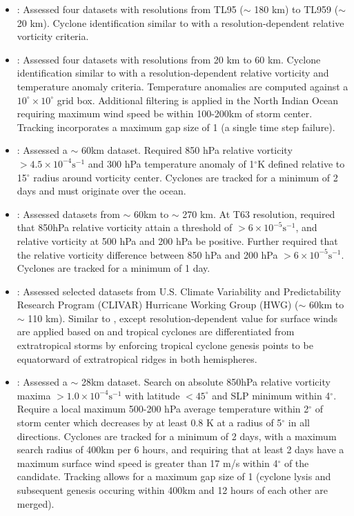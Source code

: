 \documentclass[gmdd, hvmath, online]{copernicus_discussions}
\begin{document}
\begin{itemize}
\item \cite{murakami2010effect}:  Assessed four datasets with resolutions from TL95 ($\sim$ 180 km) to TL959 ($\sim$ 20 km).  Cyclone identification similar to \cite{oouchi2006tropical} with a resolution-dependent relative vorticity criteria.

\item \cite{murakami2012future}:  Assessed four datasets with resolutions from 20 km to 60 km.  Cyclone identification similar to \cite{oouchi2006tropical} with a resolution-dependent relative vorticity and temperature anomaly criteria.  Temperature anomalies are computed against a $10^\circ \times 10^\circ$ grid box.  Additional filtering is applied in the North Indian Ocean requiring maximum wind speed be within 100-200km of storm center.  Tracking incorporates a maximum gap size of 1 (a single time step failure).

\item \cite{auyeung2012regcm, huang2014wpac}: Assessed a $\sim$ 60km dataset. Required 850 hPa relative vorticity $> 4.5 \times 10^{-4} \mbox{s}^{-1}$ and 300 hPa temperature anomaly of 1$^\circ$K defined relative to 15$^\circ$ radius around vorticity center. Cyclones are tracked for a minimum of 2 days and must originate over the ocean.

\item \cite{strachan2013investigating}:  Assessed datasets from $\sim$ 60km to $\sim$ 270 km.  At T63 resolution, required that 850hPa relative vorticity attain a threshold of $> 6 \times 10^{-5} \mbox{s}^{-1}$, and relative vorticity at 500 hPa and 200 hPa be positive.  Further required that the relative vorticity difference between 850 hPa and 200 hPa $> 6 \times 10^{-5} \mbox{s}^{-1}$.  Cyclones are tracked for a minimum of 1 day.

\item \cite{horn2014tracking}:  Assessed selected datasets from U.S. Climate Variability and Predictability Research Program (CLIVAR) Hurricane Working Group (HWG) \citep{Walsh2015CLIVAR} ($\sim$ 60km to $\sim$ 110 km). Similar to \citet{walsh2004fine}, except resolution-dependent value for surface winds are applied based on \citet{walsh2007objectively} and tropical cyclones are differentiated from extratropical storms by enforcing tropical cyclone genesis points to be equatorward of extratropical ridges in both hemispheres.

\item \cite{zarzycki2014multidecadal}:  Assessed a $\sim$ 28km dataset.  Search on absolute 850hPa relative vorticity maxima $> 1.0 \times 10^{-4} \mbox{s}^{-1}$ with latitude $< 45^\circ$ and SLP minimum within 4$^\circ$. Require a local maximum 500-200 hPa average temperature within 2$^\circ$ of storm center which decreases by at least 0.8 K at a radius of 5$^\circ$ in all directions.  Cyclones are tracked for a minimum of 2 days, with a maximum search radius of 400km per 6 hours, and requiring that at least 2 days have a maximum surface wind speed is greater than 17 m/s within 4$^\circ$ of the candidate. Tracking allows for a maximum gap size of 1 (cyclone lysis and subsequent genesis occuring within 400km and 12 hours of each other are merged).


\end{itemize}
\end{document}
